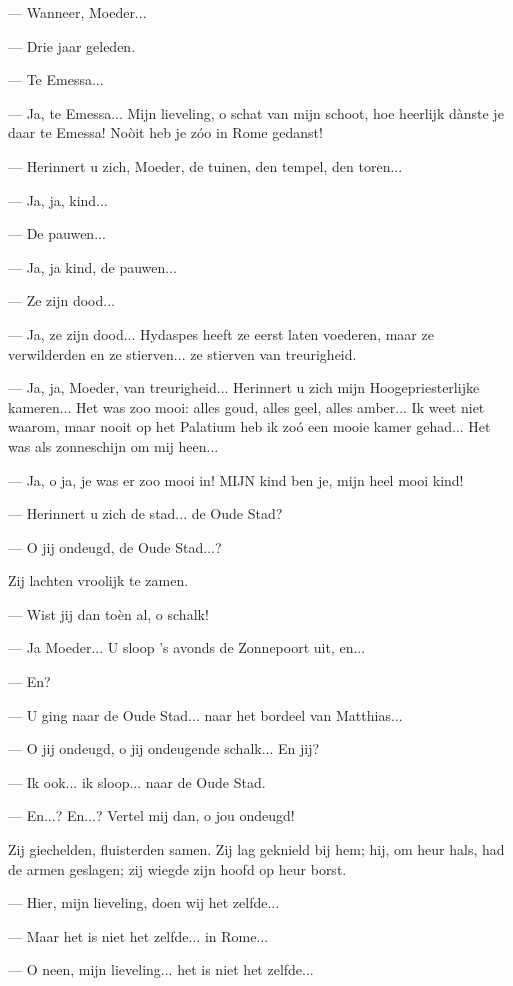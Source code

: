 \documentclass[a4paper, 12pt, oneside, dutch]{article}
\begin{document}
--- Wanneer, Moeder...

--- Drie jaar geleden.

--- Te Emessa...

--- Ja, te Emessa... Mijn lieveling, o schat van mijn schoot, hoe heerlijk dànste je daar te Emessa! Noòit heb je zóo in Rome gedanst!

--- Herinnert u zich, Moeder, de tuinen, den tempel, den toren...

--- Ja, ja, kind...

--- De pauwen...

--- Ja, ja kind, de pauwen...

--- Ze zijn dood...

--- Ja, ze zijn dood... Hydaspes heeft ze eerst laten voederen, maar ze verwilderden en ze stierven... ze stierven van treurigheid.

--- Ja, ja, Moeder, van treurigheid... Herinnert u zich mijn Hoogepriesterlijke kameren... Het was zoo mooi: alles goud, alles geel, alles amber... Ik weet niet waarom, maar nooit op het Palatium heb ik zoó een mooie kamer gehad... Het was als zonneschijn om mij heen...

--- Ja, o ja, je was er zoo mooi in! MIJN kind ben je, mijn heel mooi kind!

--- Herinnert u zich de stad... de Oude Stad?

--- O jij ondeugd, de Oude Stad...?

Zij lachten vroolijk te zamen.

--- Wist jij dan toèn al, o schalk!

--- Ja Moeder... U sloop 's avonds de Zonnepoort uit, en...

--- En?

--- U ging naar de Oude Stad... naar het bordeel van Matthias...

--- O jij ondeugd, o jij ondeugende schalk... En jij?

--- Ik ook... ik sloop... naar de Oude Stad.

--- En...? En...? Vertel mij dan, o jou ondeugd!

Zij giechelden, fluisterden samen. Zij lag geknield bij hem; hij, om heur hals, had de armen geslagen; zij wiegde zijn hoofd op heur borst.

--- Hier, mijn lieveling, doen wij het zelfde...

--- Maar het is niet het zelfde... in Rome...

--- O neen, mijn lieveling... het is niet het zelfde...
\end{document}
